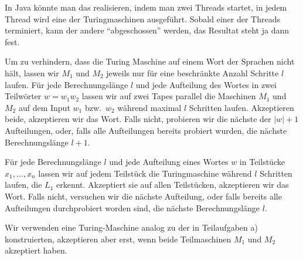 \begin{loesung}
\begin{teilaufgaben}
In Java könnte man das realisieren, indem man zwei Threads startet,
in jedem Thread wird eine der Turingmaschinen ausgeführt.
Sobald einer der Threads terminiert, kann der andere ``abgeschossen'' werden,
das Resultat steht ja dann fest.
\item
Um zu verhindern, dass die Turing Maschine auf einem Wort der
Sprachen nicht hält, lassen wir $M_1$ und $M_2$ jeweils nur für eine
beschränkte Anzahl Schritte $l$ laufen.
Für jede Berechnungslänge $l$ und jede Aufteilung des Wortes in zwei
Teilwörter $w=w_1w_2$ lassen wir auf zwei Tapes parallel die
Maschinen $M_1$ und $M_2$ auf dem Input $w_1$ bzw.~$w_2$ während
maximal $l$ Schritten laufen.
Akzeptieren beide, akzeptieren wir das Wort.
Falls nicht, probieren wir die nächste der $|w|+1$ Aufteilungen,
oder, falls alle Aufteilungen bereits probiert wurden, die nächste
Berechnungslänge $l+1$.
\item
Für jede Berechnungslänge $l$ und
jede Aufteilung eines Wortes $w$ in Teilstücke $x_1,\dots,x_n$
lassen
wir auf jedem Teilstück die Turingmaschine während $l$ Schritten
laufen, die
$L_1$ erkennt. Akzeptiert sie auf allen Teilstücken, akzeptieren wir
das Wort.
Falls nicht, versuchen wir die nächste Aufteilung, oder falls
bereits alle Aufteilungen durchprobiert worden sind, die nächste
Berechnungslänge $l$.
\item Wir verwenden eine Turing-Maschine analog zu der in Teilaufgaben a)
konstruierten, akzeptieren aber erst, wenn beide Teilmaschinen
$M_1$ und $M_2$ akzeptiert haben.
\qedhere
\end{teilaufgaben}
\end{loesung}
